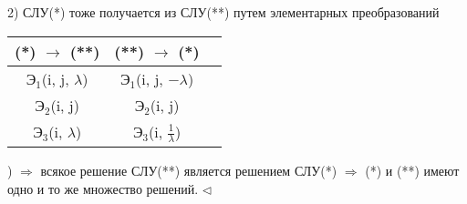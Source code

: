 2) СЛУ(*) тоже получается из СЛУ(**) путем элементарных преобразований

\begin{table}[!ht]
	\begin{center}
		\begin{tabular}{c|c|c}
    	(*) $\rightarrow$ (**) & (**) $\rightarrow$ (*) \\
        \hline
        $Э_1$(i, j, $\lambda$) & $Э_1$(i, j, $-\lambda$)\\
        $Э_2$(i, j) & $Э_2$(i, j)\\
        $Э_3$(i, $\lambda$) & $Э_3$(i, $\frac{1}{\lambda}$)
		\end{tabular}
	\end{center}
\end{table}

) $\Rightarrow$ всякое решение СЛУ(**) является решением СЛУ(*) $\Rightarrow$ (*) и (**) имеют одно и то же множество решений. $\lhd$

